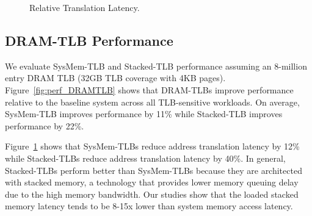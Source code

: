 \begin{figure}[tp] 
  \vspace{0.in} \centering
  \centerline{}

  \caption{\small Relative Translation Latency.\normalsize}
  \label{fig:tlblat_DRAMTLB} 
\end{figure}

% 

\subsection{DRAM-TLB Performance}





\noindent We evaluate SysMem-TLB and Stacked-TLB performance assuming
an 8-million entry DRAM TLB (32GB TLB coverage with 4KB pages).
Figure~\ref{fig:perf_DRAMTLB} shows that DRAM-TLBs improve performance
relative to the baseline system across all TLB-sensitive workloads. On
average, SysMem-TLB improves performance by 11\% while Stacked-TLB
improves performance by 22\%. 

Figure~\ref{fig:tlblat_DRAMTLB} shows that SysMem-TLBs reduce address
translation latency by 12\% while Stacked-TLBs reduce address
translation latency by 40\%. In general, Stacked-TLBs perform better
than SysMem-TLBs because they are architected with stacked memory, a
technology that provides lower memory queuing delay due to the high
memory bandwidth. Our studies show that the loaded stacked memory
latency tends to be 8-15x lower than system memory access latency.

